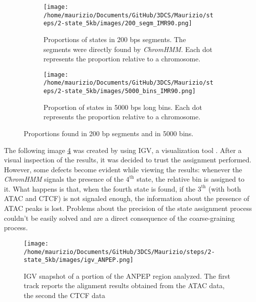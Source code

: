 \begin{figure}[H]
  \centering
  \begin{subfigure}[t]{0.40\textwidth}
    \texttt{[image: /home/maurizio/Documents/GitHub/3DCS/Maurizio/steps/2-state\_5kb/images/200\_segm\_IMR90.png]}
    \caption{Proportions of states in 200 bps segments. The segments were directly found by \textit{ChromHMM}. Each dot represents the proportion relative to a chromosome.}
    \label{fig: proportions in segments}
  \end{subfigure}
  \begin{subfigure}[t]{0.40\textwidth}
      \texttt{[image: /home/maurizio/Documents/GitHub/3DCS/Maurizio/steps/2-state\_5kb/images/5000\_bins\_IMR90.png]}
      \caption{Proportion of states in 5000 bps long bins. Each dot represents the proportion relative to a chromosome.}
      \label{fig: proportions in bins}
  \end{subfigure}
  \caption{Proportions found in 200 bp segments and in 5000 bins.}
  \label{fig: proportions bins and steps}
\end{figure}


The following image \ref{fig: ANPEP igv} was created by using IGV, a visualization tool
\cite{robinsonIgvJsEmbeddable2020, robinsonIntegrativeGenomicsViewer2011c}
. After a visual inspection of the results, it was decided to trust the assignment performed. However, some defects become evident while viewing the results: whenever the \textit{ChromHMM} signals the presence of the $4^{\text{th}}$ state, the relative bin is assigned to it. What happens is that, when the fourth state is found, if the $3^{\text{th}}$ (with both ATAC and CTCF) is not signaled enough, the information about the presence of ATAC peaks is lost. Problems about the precision of the state assignment process couldn't be easily solved and are a direct consequence of the coarse-graining process.

\begin{figure}[H]
  \centering
  \texttt{[image: /home/maurizio/Documents/GitHub/3DCS/Maurizio/steps/2-state\_5kb/images/igv\_ANPEP.png]}
  \caption{IGV snapshot of a portion of the ANPEP region analyzed. The first track reports the alignment results obtained from the ATAC data, the second the CTCF data}
  \label{fig: ANPEP igv}
\end{figure}
